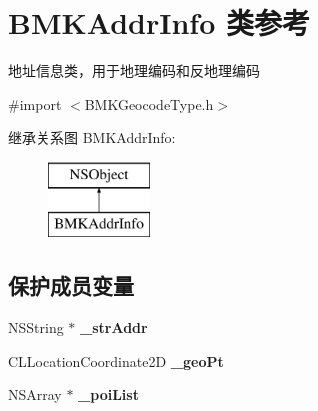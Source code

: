\hypertarget{interface_b_m_k_addr_info}{\section{B\-M\-K\-Addr\-Info 类参考}
\label{interface_b_m_k_addr_info}
}


地址信息类，用于地理编码和反地理编码  




{\ttfamily \#import $<$B\-M\-K\-Geocode\-Type.\-h$>$}

继承关系图 B\-M\-K\-Addr\-Info\-:\begin{figure}[H]
\begin{center}
\leavevmode
\includegraphics[height=2.000000cm]{interface_b_m_k_addr_info}
\end{center}
\end{figure}
\subsection*{保护成员变量}
\begin{DoxyCompactItemize}
\item 
\hypertarget{interface_b_m_k_addr_info_a82f04809725fe1e8306ef7ab75785454}{N\-S\-String $\ast$ {\bfseries \-\_\-str\-Addr}}\label{interface_b_m_k_addr_info_a82f04809725fe1e8306ef7ab75785454}

\item 
\hypertarget{interface_b_m_k_addr_info_abc03f0262eee50b80180bd79c8800c7c}{C\-L\-Location\-Coordinate2\-D {\bfseries \-\_\-geo\-Pt}}\label{interface_b_m_k_addr_info_abc03f0262eee50b80180bd79c8800c7c}

\item 
\hypertarget{interface_b_m_k_addr_info_a5144c8f6a58780898f56fdc125730fc2}{N\-S\-Array $\ast$ {\bfseries \-\_\-poi\-List}}\label{interface_b_m_k_addr_info_a5144c8f6a58780898f56fdc125730fc2}

\end{DoxyCompactItemize}
